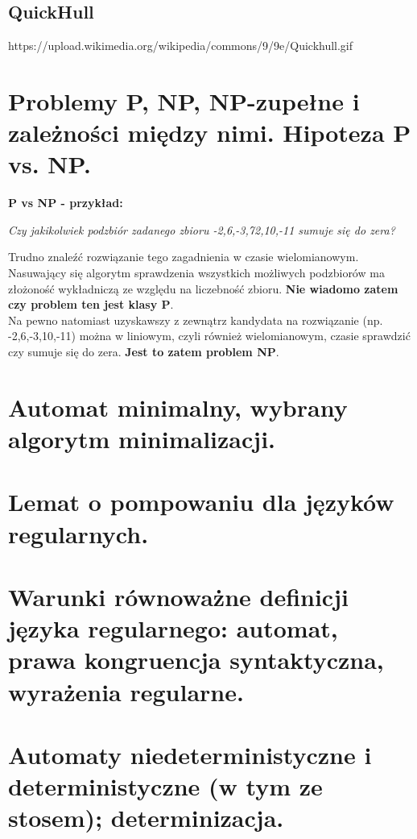 \documentclass[12pt]{article}
\begin{document}
    \subsection{QuickHull}

    https://upload.wikimedia.org/wikipedia/commons/9/9e/Quickhull.gif

    \newpage

    \section{Problemy P, NP, NP-zupełne i zależności między nimi. Hipoteza P vs. NP.}

    \textbf{P vs NP - przykład:}

    \begin{center}
        \textit{Czy jakikolwiek podzbiór zadanego zbioru {-2,6,-3,72,10,-11} sumuje się do zera?}
    \end{center}

    \noindent Trudno znaleźć rozwiązanie tego zagadnienia w czasie wielomianowym. Nasuwający się algorytm sprawdzenia wszystkich
    możliwych podzbiorów ma złożoność wykładniczą ze względu na liczebność zbioru. \textbf{Nie wiadomo zatem czy problem ten
    jest klasy P}.\\

    \noindent Na pewno natomiast uzyskawszy z zewnątrz kandydata na rozwiązanie (np. {-2,6,-3,10,-11}) można w
    liniowym, czyli również wielomianowym, czasie sprawdzić czy sumuje się do zera. \textbf{Jest to zatem problem NP}.


    \newpage

    \section{Automat minimalny, wybrany algorytm minimalizacji.}
    \section{Lemat o pompowaniu dla języków regularnych.}
    \section{Warunki równoważne definicji języka regularnego: automat, prawa kongruencja syntaktyczna, wyrażenia regularne.}
    \section{Automaty niedeterministyczne i deterministyczne (w tym ze stosem); determinizacja.}
\end{document}
